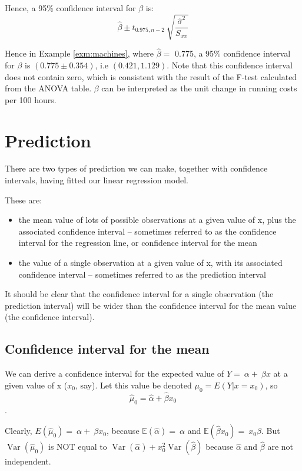 \documentclass[12pt,a4paper,openany,twoside]{report}
\theoremstyle{definition}
\theoremstyle{remark}
\theoremstyle{plain}
\newcommand{\E}{\mathbb{E}}
\newcommand{\Var}{\operatorname{Var}}
\theoremstyle{definition}
\theoremstyle{definition}
\theoremstyle{definition}
\theoremstyle{remark}
\begin{document}
Hence, a 95\% confidence interval for \(\beta\) is:
\[\hat{\beta} \pm t_{0.975,n - 2}\ \sqrt{\frac{{\hat{\sigma}}^{2}}{S_{xx}}}\]

Hence in Example \ref{exm:machines}, where \(\hat{\beta} =\) 0.775, a 95\%
confidence interval for \(\beta\) is \((0.775 \pm 0.354)\), i.e \((0.421, 1.129)\).
Note that this confidence interval does not contain zero, which is consistent with the result of the F-test calculated from the ANOVA table.
\(\beta\) can be interpreted as the unit change in running costs per 100 hours.

\hypertarget{slrpred}{%
\section{Prediction}\label{slrpred}}

There are two types of prediction we can make, together with confidence
intervals, having fitted our linear regression model.

These are:

\begin{itemize}
\item
  the mean value of lots of possible observations at a given value of x,
  plus the associated confidence interval -- sometimes referred to as
  the confidence interval for the regression line, or confidence
  interval for the mean
\item
  the value of a single observation at a given value of x, with its
  associated confidence interval -- sometimes referred to as
  the prediction interval
\end{itemize}

It should be clear that the confidence interval for a single
observation (the prediction interval) will be wider than the confidence interval for the mean
value (the confidence interval).

\hypertarget{meanci}{%
\subsection{Confidence interval for the mean}\label{meanci}}

We can derive a confidence interval for the expected value of
\(Y = \ \alpha + \ \beta x\) at a given value of x (\(x_{0}\), say).
Let this value be denoted \(\mu_0=E(Y|x=x_0)\), so
\[{\hat{\mu}}_{0} = \hat{\alpha} + \hat{\beta}x_{0}\].

Clearly, \(E({\hat{\mu}}_{0}) = \ \alpha + \ \beta x_{0}\), because
\(\E(\hat{\alpha}) = \ \alpha\) and
\(\E(\hat{\beta}x_{0}) = \ x_{0}\beta\).
But \(\Var({\hat{\mu}}_{0})\) is NOT equal to
\(\Var(\hat{\alpha})+x_{0}^{2} \Var(\hat{\beta})\) because
\(\hat{\alpha}\) and \(\hat{\beta}\) are not independent.
\end{document}
